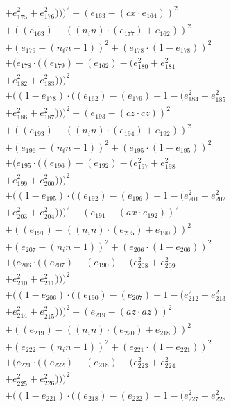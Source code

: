 \documentclass[10pt, a4paper]{article}
\begin{document}
\begin{align*}
& + e_{175}^{2} + e_{176}^{2})))^{2} + (e_{163} - (cx  \cdot  e_{164}))^{2} \\
& + ((e_{163}) - ((n_in)  \cdot  (e_{177}) + e_{162}))^{2} \\
& + (e_{179} - (n_in - 1))^{2} + (e_{178}  \cdot  (1 - e_{178}))^{2} \\
& + (e_{178}  \cdot  ((e_{179}) - (e_{162}) - (e_{180}^{2} + e_{181}^{2} \\
& + e_{182}^{2} + e_{183}^{2})))^{2} \\
& + ((1 - e_{178})  \cdot  ((e_{162}) - (e_{179}) - 1 - (e_{184}^{2} + e_{185}^{2} \\
& + e_{186}^{2} + e_{187}^{2})))^{2} + (e_{193} - (cz  \cdot  cz))^{2} \\
& + ((e_{193}) - ((n_in)  \cdot  (e_{194}) + e_{192}))^{2} \\
& + (e_{196} - (n_in - 1))^{2} + (e_{195}  \cdot  (1 - e_{195}))^{2} \\
& + (e_{195}  \cdot  ((e_{196}) - (e_{192}) - (e_{197}^{2} + e_{198}^{2} \\
& + e_{199}^{2} + e_{200}^{2})))^{2} \\
& + ((1 - e_{195})  \cdot  ((e_{192}) - (e_{196}) - 1 - (e_{201}^{2} + e_{202}^{2} \\
& + e_{203}^{2} + e_{204}^{2})))^{2} + (e_{191} - (ax  \cdot  e_{192}))^{2} \\
& + ((e_{191}) - ((n_in)  \cdot  (e_{205}) + e_{190}))^{2} \\
& + (e_{207} - (n_in - 1))^{2} + (e_{206}  \cdot  (1 - e_{206}))^{2} \\
& + (e_{206}  \cdot  ((e_{207}) - (e_{190}) - (e_{208}^{2} + e_{209}^{2} \\
& + e_{210}^{2} + e_{211}^{2})))^{2} \\
& + ((1 - e_{206})  \cdot  ((e_{190}) - (e_{207}) - 1 - (e_{212}^{2} + e_{213}^{2} \\
& + e_{214}^{2} + e_{215}^{2})))^{2} + (e_{219} - (az  \cdot  az))^{2} \\
& + ((e_{219}) - ((n_in)  \cdot  (e_{220}) + e_{218}))^{2} \\
& + (e_{222} - (n_in - 1))^{2} + (e_{221}  \cdot  (1 - e_{221}))^{2} \\
& + (e_{221}  \cdot  ((e_{222}) - (e_{218}) - (e_{223}^{2} + e_{224}^{2} \\
& + e_{225}^{2} + e_{226}^{2})))^{2} \\
& + ((1 - e_{221})  \cdot  ((e_{218}) - (e_{222}) - 1 - (e_{227}^{2} + e_{228}^{2} \\

\end{align*}
\end{document}
